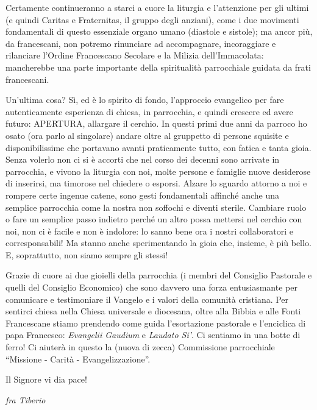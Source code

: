 Certamente continueranno a starci a cuore la liturgia e l’attenzione per gli ultimi (e quindi 
Caritas e Fraternitas, il gruppo degli anziani), come i due movimenti fondamentali di questo 
essenziale organo umano (diastole e sistole); ma ancor più, da francescani, non potremo rinunciare 
ad accompagnare, incoraggiare e rilanciare l’Ordine Francescano Secolare e la Milizia 
dell’Immacolata: mancherebbe una parte importante della spiritualità parrocchiale guidata da frati 
francescani.

Un’ultima cosa? Sì, ed è lo spirito di fondo, l’approccio evangelico per fare autenticamente 
esperienza di chiesa, in parrocchia, e quindi crescere ed avere futuro: APERTURA, allargare il 
cerchio. In questi primi due anni da parroco ho osato (ora parlo al singolare) andare oltre al 
gruppetto di persone squisite e disponibilissime che portavano avanti praticamente tutto, con fatica 
e tanta gioia. Senza volerlo non ci si è accorti che nel corso dei decenni sono arrivate in parrocchia, 
e vivono la liturgia con noi, molte persone e famiglie nuove desiderose di inserirsi, ma timorose nel 
chiedere o esporsi. Alzare lo sguardo attorno a noi e rompere certe ingenue catene, sono gesti 
fondamentali affinché anche una semplice parrocchia come la nostra non soffochi e diventi sterile. 
Cambiare ruolo o fare un semplice passo indietro perché un altro possa mettersi nel cerchio con noi, 
non ci è facile e non è indolore: lo sanno bene ora i nostri collaboratori e corresponsabili! Ma stanno 
anche sperimentando la gioia che, insieme, è più bello. E, soprattutto, non siamo sempre gli stessi!

Grazie di cuore ai due gioielli della parrocchia (i membri del Consiglio Pastorale e quelli del 
Consiglio Economico) che sono davvero una forza entusiasmante per comunicare e testimoniare il 
Vangelo e i valori della comunità cristiana. Per sentirci chiesa nella Chiesa universale e diocesana, 
oltre alla Bibbia e alle Fonti Francescane stiamo prendendo come guida l’esortazione pastorale e 
l’enciclica di papa Francesco: \textit{Evangelii Gaudium} e \textit{Laudato Si’}. Ci sentiamo in una botte di ferro! 
Ci aiuterà in questo la (nuova di zecca) Commissione parrocchiale “Missione - Carità - 
Evangelizzazione”.

\noindent Il Signore vi dia pace!
\begin{flushright}
\textit{fra Tiberio}
\end{flushright}
\endgroup

